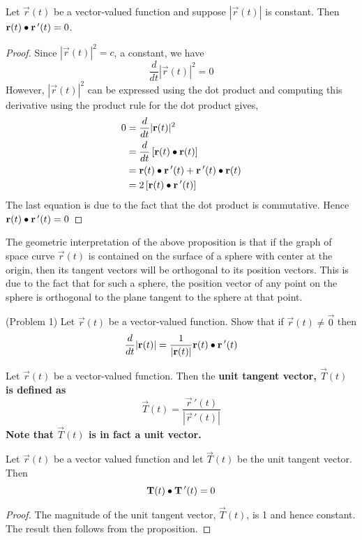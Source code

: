 \documentclass[handout]{ximera}
\begin{document}
\begin{proposition}
Let $\vec r(t)$ be a vector-valued function and suppose $|\vec r(t)|$ is constant. Then $\mathbf r(t) \bullet \mathbf r\,'(t) = 0$.\\
\end{proposition}
\begin{proof}
Since $|\vec r(t)|^2 = c$, a constant, we have
\[
\frac{d}{dt} |\vec r(t)|^2 = 0
\]
However, $|\vec r(t)|^2$ can be expressed using the dot product and computing this derivative using the product rule for the dot product gives,
\begin{align*}
0 &= \frac{d}{dt} |\mathbf r(t)|^2 \\
&= \frac{d}{dt} \left[\mathbf r(t) \bullet \mathbf r(t)\right] \\
  &= \mathbf r(t) \bullet \mathbf r\,'(t) + \mathbf r\,'(t) \bullet \mathbf r(t) \\
  &= 2 \left[\mathbf r(t) \bullet \mathbf r\,'(t)\right]
\end{align*}
The last equation is due to the fact that the dot product is commutative. Hence $\mathbf r(t) \bullet \mathbf r\,'(t) = 0$
\end{proof}

\begin{remark}
The geometric interpretation of the above proposition is that if the graph of space curve $\vec r(t)$ is contained 
on the surface of a sphere with center at the origin,
then its tangent vectors will be orthogonal to its position vectors.  
This is due to the fact that for such a sphere, the position vector of any point on the sphere is 
orthogonal to the plane tangent to the sphere at that point.
\end{remark}

\begin{problem}(Problem 1)
Let $\vec r(t)$ be a vector-valued function. Show that if $\vec r(t) \neq \vec 0$ then 
\[
\frac{d}{dt} |\mathbf r(t)| = \frac{1}{|\mathbf r(t)|} \mathbf r(t) \bullet \mathbf r\,'(t)
\]
\end{problem}

\begin{definition}
Let $\vec r(t)$ be a vector-valued function. Then the \bf{unit tangent vector}, $\vec T(t)$ is defined as
\[
\vec T(t) = \frac{\vec r\,'(t)}{|\vec r\,'(t)|}
\]
Note that $\vec T(t)$ is in fact a unit vector.
\end{definition}

\begin{corollary}
Let $\vec r(t)$ be a vector valued function and let $\vec T(t)$ be the unit tangent vector.
Then 
\[
\mathbf T(t) \bullet \mathbf T\,'(t) = 0
\]
\end{corollary}
\begin{proof}
The magnitude of the unit tangent vector, $\vec T(t)$, is 1 and hence constant. The result then follows from the proposition.
\end{proof}
\end{document}
